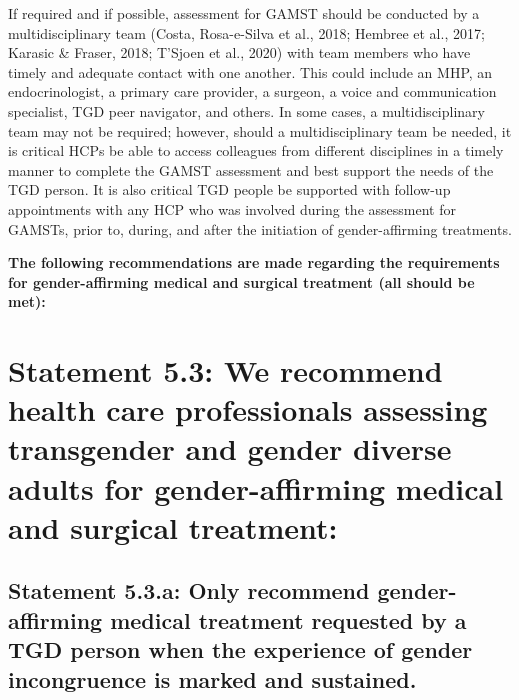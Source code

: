 \documentclass[
]{book}
\begin{document}
If required and if possible, assessment for
GAMST should be conducted by a multidisciplinary team (Costa, Rosa-e-Silva et al., 2018;
Hembree et al., 2017; Karasic \& Fraser, 2018;
T'Sjoen et al., 2020) with team members who
have timely and adequate contact with one
another. This could include an MHP, an endocrinologist, a primary care provider, a surgeon,
a voice and communication specialist, TGD peer
navigator, and others. In some cases, a multidisciplinary team may not be required; however,
should a multidisciplinary team be needed, it is
critical HCPs be able to access colleagues from
different disciplines in a timely manner to complete the GAMST assessment and best support
the needs of the TGD person. It is also critical
TGD people be supported with follow-up
appointments with any HCP who was involved
during the assessment for GAMSTs, prior to,
during, and after the initiation of gender-affirming
treatments.

\textbf{The following recommendations are made
regarding the requirements for gender-affirming
medical and surgical treatment (all should
be met):}

\hypertarget{statement-5.3-we-recommend-health-care-professionals-assessing-transgender-and-gender-diverse-adults-for-gender-affirming-medical-and-surgical-treatment}{%
\section*{Statement 5.3: We recommend health care professionals assessing transgender and gender diverse adults for gender-affirming medical and surgical treatment:}\label{statement-5.3-we-recommend-health-care-professionals-assessing-transgender-and-gender-diverse-adults-for-gender-affirming-medical-and-surgical-treatment}}

\hypertarget{statement-5.3.a-only-recommend-gender-affirming-medical-treatment-requested-by-a-tgd-person-when-the-experience-of-gender-incongruence-is-marked-and-sustained.}{%
\subsection*{Statement 5.3.a: Only recommend gender-affirming medical treatment requested by a TGD person when the experience of gender incongruence is marked and sustained.}\label{statement-5.3.a-only-recommend-gender-affirming-medical-treatment-requested-by-a-tgd-person-when-the-experience-of-gender-incongruence-is-marked-and-sustained.}}
\end{document}
